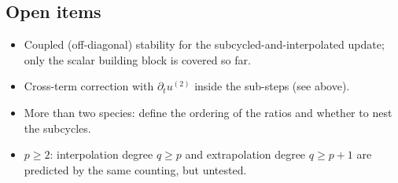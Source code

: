 \subsection{Open items}

\begin{itemize}
  \item Coupled (off-diagonal) stability for the subcycled-and-interpolated update; only the scalar building block is covered so far.
  \item Cross-term correction with $\partial_t u^{(2)}$ inside the sub-steps (see above).
  \item More than two species: define the ordering of the ratios and whether to nest the subcycles.
  \item $p \ge 2$: interpolation degree $q \ge p$ and extrapolation degree $q \ge p+1$ are predicted by the same counting, but untested.
\end{itemize}
